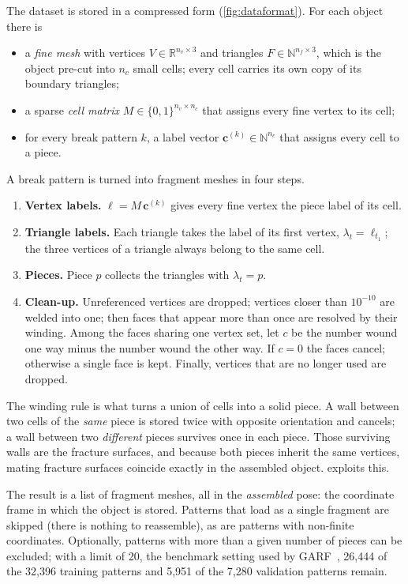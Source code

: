 \documentclass[11pt,a4paper]{article}
\theoremstyle{remark}
\newcommand{\R}{\mathbb{R}}
\begin{document}
The dataset is stored in a compressed form (\cref{fig:dataformat}). For each object there is
\begin{itemize}
  \item a \emph{fine mesh} with vertices $V\in\R^{n_v\times3}$ and triangles $F\in\mathbb N^{n_f\times3}$, which is the object pre-cut into $n_c$ small cells; every cell carries its own copy of its boundary triangles;
  \item a sparse \emph{cell matrix} $M\in\{0,1\}^{n_v\times n_c}$ that assigns every fine vertex to its cell;
  \item for every break pattern $k$, a label vector $\mathbf c^{(k)}\in\mathbb N^{n_c}$ that assigns every cell to a piece.
\end{itemize}
A break pattern is turned into fragment meshes in four steps.
\begin{enumerate}
  \item \textbf{Vertex labels.} $\boldsymbol\ell=M\,\mathbf c^{(k)}$ gives every fine vertex the piece label of its cell.
  \item \textbf{Triangle labels.} Each triangle takes the label of its first vertex, $\lambda_t=\ell_{t_1}$; the three vertices of a triangle always belong to the same cell.
  \item \textbf{Pieces.} Piece $p$ collects the triangles with $\lambda_t=p$.
  \item \textbf{Clean-up.} Unreferenced vertices are dropped; vertices closer than $10^{-10}$ are welded into one; then faces that appear more than once are resolved by their winding. Among the faces sharing one vertex set, let $c$ be the number wound one way minus the number wound the other way. If $c=0$ the faces cancel; otherwise a single face is kept. Finally, vertices that are no longer used are dropped.
\end{enumerate}
The winding rule is what turns a union of cells into a solid piece. A wall between two cells of the \emph{same} piece is stored twice with opposite orientation and cancels; a wall between two \emph{different} pieces survives once in each piece. Those surviving walls are the fracture surfaces, and because both pieces inherit the same vertices, mating fracture surfaces coincide exactly in the assembled object.  exploits this.

The result is a list of fragment meshes, all in the \emph{assembled} pose: the coordinate frame in which the object is stored. Patterns that load as a single fragment are skipped (there is nothing to reassemble), as are patterns with non-finite coordinates. Optionally, patterns with more than a given number of pieces can be excluded; with a limit of 20, the benchmark setting used by GARF~\cite{li2025garf}, 26{,}444 of the 32{,}396 training patterns and 5{,}951 of the 7{,}280 validation patterns remain.
\end{document}

